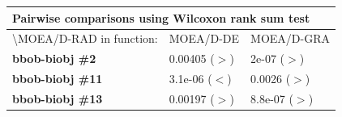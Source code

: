 \begin{table}[]
	\begin{tabular}{|l|l|l|}
		\hline
		\multicolumn{3}{|l|}{\textbf{Pairwise comparisons using Wilcoxon rank sum test}} \\ \hline
		\textbackslash{MOEA/D-RAD in function:}              & MOEA/D-DE              & MOEA/D-GRA              \\ \hline
			\textbf{bbob-biobj \#2}                  & 0.00405 ($>$)               & 2e-07      ($>$)             \\ \hline
		\textbf{bbob-biobj \#11}          & 3.1e-06 ($<$)               & 0.0026  ($>$) \\ \hline
		\textbf{bbob-biobj \#13}          &  0.00197 ($>$)               & 8.8e-07   ($>$) \\ \hline
		
	\end{tabular}
\end{table}